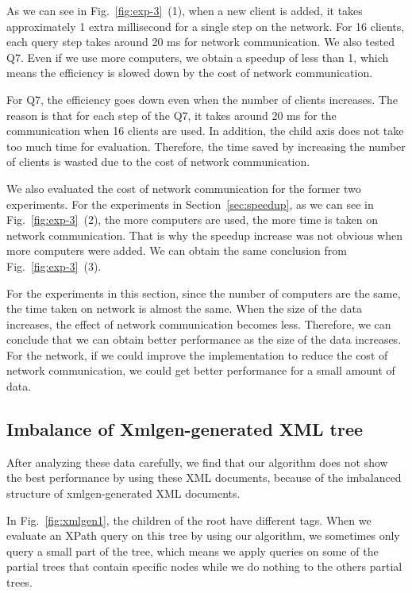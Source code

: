 As we can see in Fig.~\ref{fig:exp-3}~(1), when a new client is added,
it takes approximately 1 extra millisecond for a single step on the network. 
For 16 clients, each query step takes around 20 ms for network
communication. We also tested Q7. Even if we use more computers, we obtain a
speedup of less than 1, which means the efficiency is slowed down by the
cost of network communication.

For Q7, the efficiency goes down even when the number of clients
increases. The reason is that for each step of the Q7, it takes around
20 ms for the communication when 16 clients are used. In addition, the
child axis does not take too much time for evaluation. Therefore, the
time saved by increasing the number of clients is wasted due to the cost of
network communication.

We also evaluated the cost of network communication for the former two
experiments. 
For the experiments in Section~\ref{sec:speedup}, as we can
see in Fig.~\ref{fig:exp-3}~(2), the more computers are used, the more
time is taken on network communication.  That is why the speedup increase 
was not obvious when more computers were added.  We can obtain the
same conclusion from Fig.~\ref{fig:exp-3}~(3).  

For the experiments in this section, since the number of computers are the same,
the time taken on network is almost the same. When the size of the
data increases, the effect of network communication becomes
less. Therefore, we can conclude that we can obtain better performance as
the size of the data increases. For the network, if we could improve the 
implementation to reduce the cost of network communication, 
we could get better performance for a small amount of data.

\subsection{Imbalance of Xmlgen-generated XML tree}
After analyzing these data carefully, we find that our 
algorithm does not show the best performance by using these XML documents,
because of the imbalanced structure of xmlgen-generated XML documents. 

In Fig.~\ref{fig:xmlgen1}, the children of the root have different tags. 
When we evaluate an XPath query on this tree by using 
our algorithm, we sometimes only query a small part of the tree, which means we apply queries 
on some of the partial trees that contain specific nodes while we do nothing to the others partial trees. 


